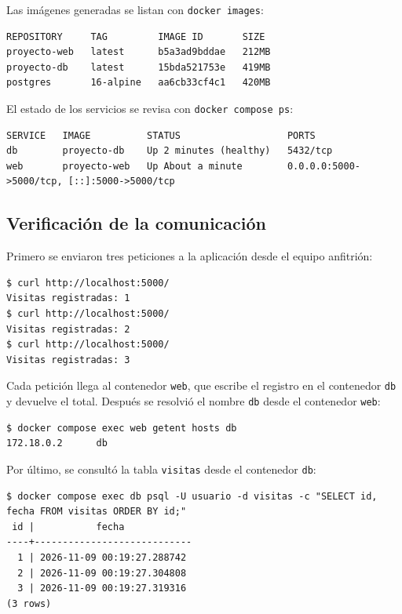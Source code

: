 \documentclass[stu,a4paper,floatsintext]{apa7}
\begin{document}
Las imágenes generadas se listan con \texttt{docker images}:

\begin{lstlisting}
REPOSITORY     TAG         IMAGE ID       SIZE
proyecto-web   latest      b5a3ad9bddae   212MB
proyecto-db    latest      15bda521753e   419MB
postgres       16-alpine   aa6cb33cf4c1   420MB
\end{lstlisting}

El estado de los servicios se revisa con \texttt{docker compose ps}:

\begin{lstlisting}
SERVICE   IMAGE          STATUS                   PORTS
db        proyecto-db    Up 2 minutes (healthy)   5432/tcp
web       proyecto-web   Up About a minute        0.0.0.0:5000->5000/tcp, [::]:5000->5000/tcp
\end{lstlisting}

\subsection{Verificación de la comunicación}

Primero se enviaron tres peticiones a la aplicación desde el equipo anfitrión:

\begin{lstlisting}
$ curl http://localhost:5000/
Visitas registradas: 1
$ curl http://localhost:5000/
Visitas registradas: 2
$ curl http://localhost:5000/
Visitas registradas: 3
\end{lstlisting}

Cada petición llega al contenedor \texttt{web}, que escribe el registro en el contenedor \texttt{db} y devuelve el total. Después se resolvió el nombre \texttt{db} desde el contenedor \texttt{web}:

\begin{lstlisting}
$ docker compose exec web getent hosts db
172.18.0.2      db
\end{lstlisting}

Por último, se consultó la tabla \texttt{visitas} desde el contenedor \texttt{db}:

\begin{lstlisting}
$ docker compose exec db psql -U usuario -d visitas -c "SELECT id, fecha FROM visitas ORDER BY id;"
 id |           fecha
----+----------------------------
  1 | 2026-11-09 00:19:27.288742
  2 | 2026-11-09 00:19:27.304808
  3 | 2026-11-09 00:19:27.319316
(3 rows)
\end{lstlisting}
\end{document}
